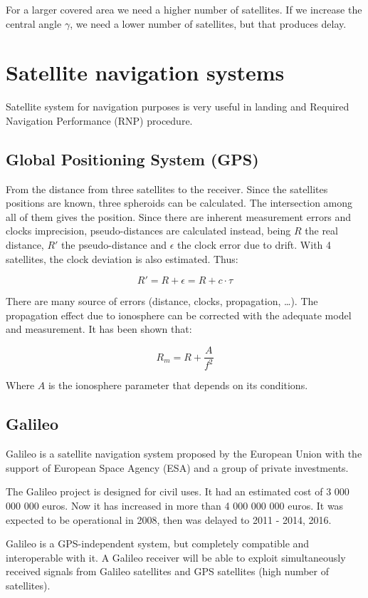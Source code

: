 \documentclass[../main.tex]{subfiles}
\begin{document}
For a larger covered area we need a higher number of satellites. If we increase the central angle $\gamma$, we need a lower number of satellites, but that produces delay.

\section{Satellite navigation systems}

Satellite system for navigation purposes is very useful in landing and Required Navigation Performance (RNP) procedure.

\subsection{Global Positioning System (GPS)}

From the distance from three satellites to the receiver. Since the satellites positions are known, three spheroids can be calculated. The intersection among all of them gives the position. Since there are inherent measurement errors and clocks imprecision, pseudo-distances are calculated instead, being $R$ the real distance, $R'$ the pseudo-distance and $\epsilon$ the clock error due to drift. With 4 satellites, the clock deviation is also estimated. Thus:

$$
	R' = R + \epsilon = R + c \cdot \tau
$$

There are many source of errors (distance, clocks, propagation, \ldots). The propagation effect due to ionosphere can be corrected with the adequate model and measurement. It has been shown that:

$$
	R_m = R + \frac {A} {f^2}
$$

Where $A$ is the ionosphere parameter that depends on its conditions.

\subsection{Galileo}

Galileo is a satellite navigation system proposed by the European Union with the support of European Space Agency (ESA) and a group of private investments.

The Galileo project is designed for civil uses. It had an estimated cost of 3 000 000 000 euros. Now it has increased in more than 4 000 000 000 euros. It was expected to be operational in 2008, then was delayed to 2011 - 2014, 2016.

Galileo is a GPS-independent system, but completely compatible and interoperable with it. A Galileo receiver will be able to exploit simultaneously received signals from Galileo satellites and GPS satellites (high number of satellites).
\end{document}
